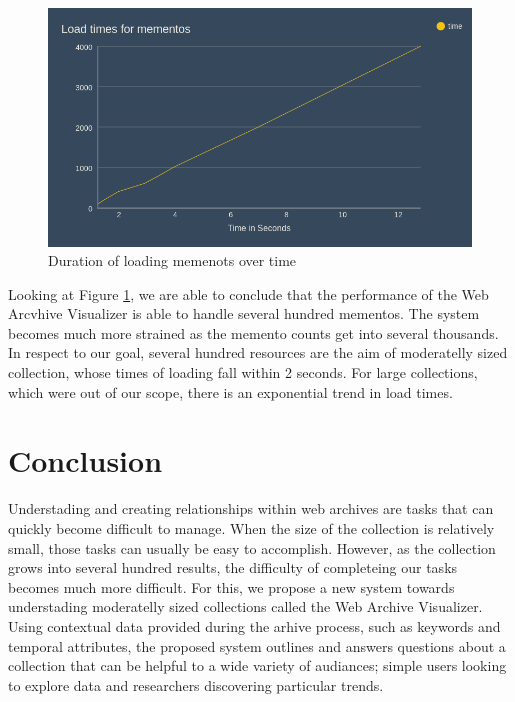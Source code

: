 \documentclass[10pt,journal,compsoc]{IEEEtran}
\begin{document}
\begin{figure}[b]
\centering
\includegraphics[scale=0.2]{Figure5}
\caption{Duration of loading memenots over time}
\label{fig:mesh4}
\end{figure}

Looking at Figure \ref{fig:mesh4}, we are able to conclude that the performance of the Web Arcvhive Visualizer is able to handle several hundred mementos. The system becomes much more strained as the memento counts get into several thousands. In respect to our goal, several hundred resources are the aim of moderatelly sized collection, whose times of loading fall within 2 seconds. For large collections, which were out of our scope, there is an exponential trend in load times. \par

\section{Conclusion}
Understading and creating relationships within web archives are tasks that can quickly become difficult to manage. When the size of the collection is relatively small, those tasks can usually be easy to accomplish. However, as the collection grows into several hundred results, the difficulty of completeing our tasks becomes much more difficult. For this, we propose a new system towards understading moderatelly sized collections called the Web Archive Visualizer. Using contextual data provided during the arhive process, such as keywords and temporal attributes, the proposed system outlines and answers questions about a collection that can be helpful to a wide variety of audiances; simple users looking to explore data and researchers discovering particular trends. \par
\end{document}
